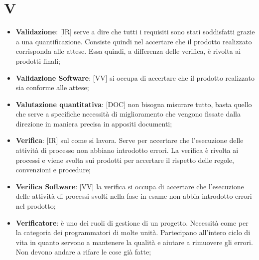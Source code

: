 %
%
%

\section{V}

\begin{itemize}
	\item \textbf{Validazione}: [IR] serve a dire che tutti i requisiti sono stati soddisfatti grazie a una quantificazione. Consiste quindi nel accertare che il prodotto realizzato corrisponda alle attese. Essa quindi, a differenza delle verifica, è rivolta ai prodotti finali;

	\item \textbf{Validazione Software}: [VV] si occupa di accertare che il prodotto realizzato sia conforme alle attese;

	\item \textbf{Valutazione quantitativa}: [DOC] non bisogna misurare tutto, basta quello che serve a specifiche necessità di miglioramento che vengono fissate dalla direzione in maniera precisa in appositi documenti;

	\item \textbf{Verifica}: [IR] sul come si lavora. Serve per accertare che l'esecuzione delle attività di processo non abbiano introdotto errori. La verifica è rivolta ai processi e viene svolta sui prodotti per accertare il rispetto delle regole, convenzioni e procedure;

	\item \textbf{Verifica Software}: [VV] la verifica si occupa di accertare che l'esecuzione delle attività di processi svolti nella fase in esame non abbia introdotto errori nel prodotto;


	\item \textbf{Verificatore}: è uno dei ruoli di gestione di un progetto. Necessità come per la categoria dei programmatori di molte unità. Partecipano all'intero ciclo di vita in quanto servono a mantenere la qualità e aiutare a rimuovere gli errori. Non devono andare a rifare le cose già fatte;


\end{itemize}
